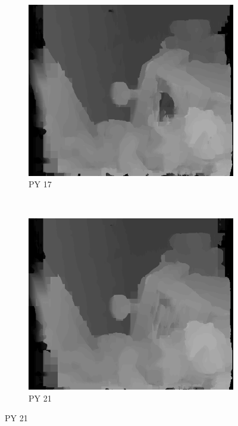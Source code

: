 \begin{figure}
\begin{subfigure}[b]{0.23\textwidth}
    \centering
    \includegraphics[width=\textwidth]{images/stereo-pairs/teddy_pyramid_17.png}
    \caption{PY 17}
  \end{subfigure}
  ~
  \begin{subfigure}[b]{0.23\textwidth}
    \centering
    \includegraphics[width=\textwidth]{images/stereo-pairs/teddy_pyramid_21.png}
    \caption{PY 21}
  \end{subfigure}





\end{figure}
